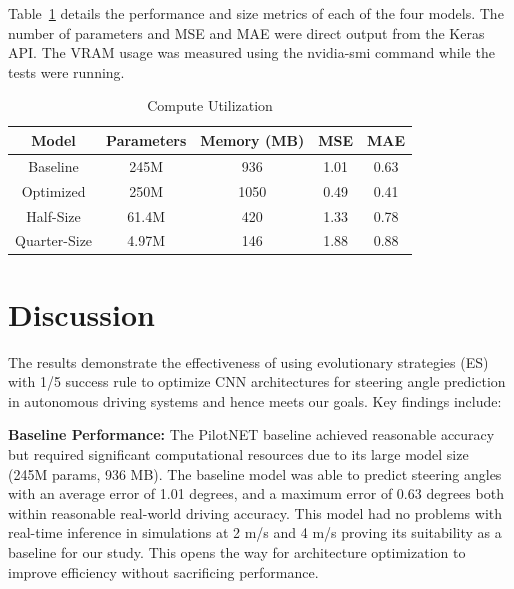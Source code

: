 \documentclass[conference]{IEEEtran}
\begin{document}
Table~\ref{tab:compute} details the performance and size metrics of each of the four models. The number of parameters and MSE and MAE were direct output from the Keras API. The VRAM usage was measured using the nvidia-smi command while the tests were running.

\begin{table}[ht!]
    \centering
    \caption{Compute Utilization}
    \begin{tabular}{c|c|c|c|c}

        \textbf{Model} & \textbf{Parameters} & \textbf{Memory (MB)} & \textbf{MSE} & \textbf{MAE} \\
        \hline
        Baseline       & 245M                & 936                  & 1.01         & 0.63         \\
        Optimized      & 250M                & 1050                 & 0.49         & 0.41         \\
        Half-Size      & 61.4M               & 420                  & 1.33         & 0.78         \\
        Quarter-Size   & 4.97M               & 146                  & 1.88         & 0.88         \\
    \end{tabular}
    \label{tab:compute}
\end{table}

\section{Discussion}
The results demonstrate the effectiveness of using evolutionary strategies (ES) with 1/5 success rule to optimize CNN architectures for steering angle prediction in autonomous driving systems and hence meets our goals. Key findings include:

\textbf{Baseline Performance: }The PilotNET baseline achieved reasonable accuracy but required significant computational resources due to its large model size (245M params, 936 MB). The baseline model was able to predict steering angles with an average error of 1.01 degrees, and a maximum error of 0.63 degrees both within reasonable real-world driving accuracy. This model had no problems with real-time inference in simulations at 2 m/s and 4 m/s proving its suitability as a baseline for our study. This opens the way for architecture optimization to improve efficiency without sacrificing performance.
\end{document}
